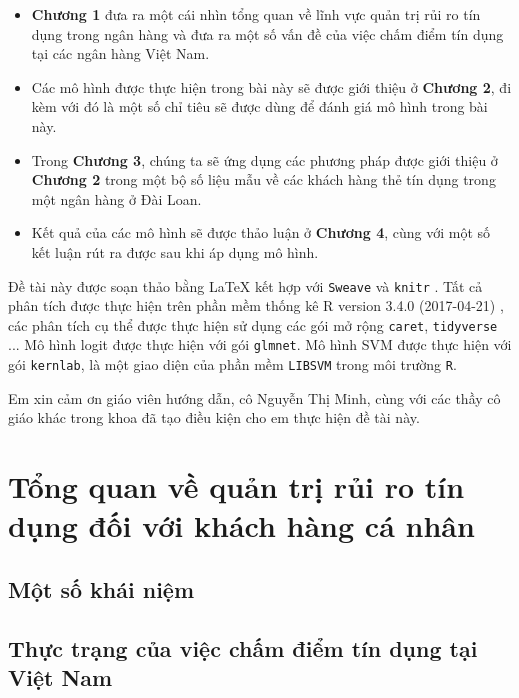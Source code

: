 \documentclass[a4paper]{report}\usepackage[]{graphicx}\usepackage[]{color}
\begin{document}
\begin{itemize}
\item \textbf{Chương 1} đưa ra một cái nhìn tổng quan về lĩnh vực quản trị rủi ro tín dụng trong ngân hàng và đưa ra một số vấn đề của việc chấm điểm tín dụng tại các ngân hàng Việt Nam.
\item Các mô hình được thực hiện trong bài này sẽ được giới thiệu ở \textbf{Chương 2}, đi kèm với đó là một số chỉ tiêu sẽ được dùng để đánh giá mô hình trong bài này.
\item Trong \textbf{Chương 3}, chúng ta sẽ ứng dụng các phương pháp được giới thiệu ở \textbf{Chương 2} trong một bộ số liệu mẫu về các khách hàng thẻ tín dụng trong một ngân hàng ở Đài Loan.
\item Kết quả của các mô hình sẽ được thảo luận ở \textbf{Chương 4}, cùng với một số kết luận rút ra được sau khi áp dụng mô hình.
\end{itemize}

Đề tài này được soạn thảo bằng \LaTeX{} kết hợp với \texttt{Sweave} và \texttt{knitr} 
\parencite{r:knitr}. Tất cả phân tích được thực hiện trên phần mềm thống kê 
R version 3.4.0 (2017-04-21) \parencite{r:rbase},  
các phân tích cụ thể được thực hiện sử dụng các gói mở rộng \texttt{caret}\parencite{r:caret}, \texttt{tidyverse} \parencite{r:tidyverse}... Mô hình logit được thực hiện với gói \texttt{glmnet}\parencite{r:glmnet}. 
Mô hình SVM được thực hiện với gói \texttt{kernlab}\parencite{r:kernlab}, là một giao diện của phần mềm \texttt{LIBSVM} \parencite{CC01a} trong môi trường \texttt{R}.

Em xin cảm ơn giáo viên hướng dẫn, cô Nguyễn Thị Minh, cùng với các thầy cô giáo khác trong khoa đã tạo điều kiện cho em thực hiện đề tài này.

\chapter{Tổng quan về quản trị rủi ro tín dụng đối với khách hàng cá nhân}

\section{Một số khái niệm}

\section{Thực trạng của việc chấm điểm tín dụng tại Việt Nam}
\end{document}
